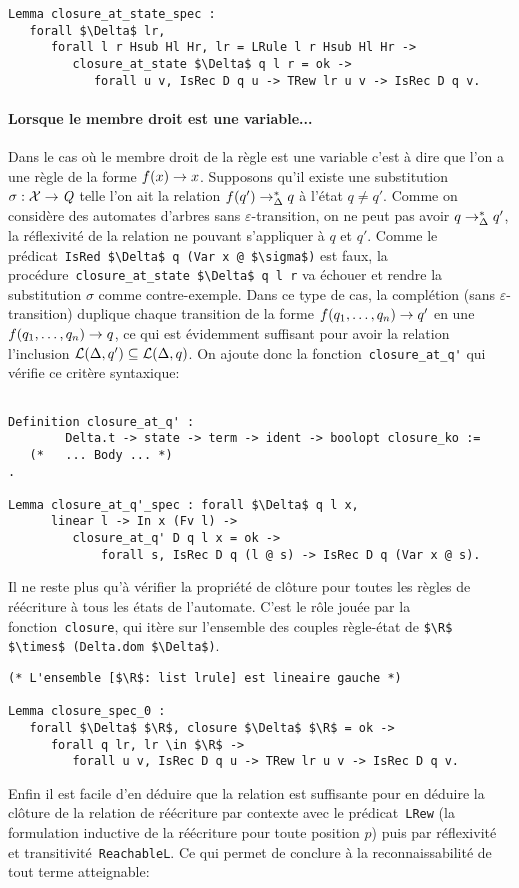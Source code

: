 \begin{lstlisting}
Lemma closure_at_state_spec : 
   forall $\Delta$ lr, 
      forall l r Hsub Hl Hr, lr = LRule l r Hsub Hl Hr ->
         closure_at_state $\Delta$ q l r = ok ->
            forall u v, IsRec D q u -> TRew lr u v -> IsRec D q v.
\end{lstlisting}


\paragraph{Lorsque le membre droit est une variable...}
\label{par:si-le-membre}
Dans le cas où le membre droit de la règle est une variable c'est à dire que l'on a une règle de la forme 
$f(x) \rightarrow x$. Supposons qu'il existe une substitution $\sigma : \mathcal X \rightarrow \mathit Q$ telle l'on ait la relation 
$f(q') \rightarrow_\Delta^* q$ à l'état $q \not= q'$. Comme on considère des automates d'arbres sans $\varepsilon$-transition,
on ne peut pas avoir $q \rightarrow^*_\Delta q'$, la réflexivité de la relation ne pouvant s'appliquer à $q$ et $q'$.
Comme le prédicat~\lstinline!IsRed $\Delta$ q (Var x @ $\sigma$)! est faux, la procédure~\lstinline!closure_at_state $\Delta$ q l r!
va échouer et rendre la substitution $\sigma$ comme contre-exemple. 
Dans ce type de cas, la complétion (sans $\varepsilon$-transition) duplique chaque transition de la forme $f(q_1,\dots,q_n) \rightarrow q'$ en une $f(q_1,\dots,q_n) \rightarrow q$,
ce qui est évidemment suffisant pour avoir la relation l'inclusion $\mathcal{L}(\Delta, q') \subseteq \mathcal{L}(\Delta, q)$.
On ajoute donc la fonction~\lstinline!closure_at_q'! qui vérifie ce critère syntaxique:

\begin{lstlisting}

Definition closure_at_q' :
        Delta.t -> state -> term -> ident -> boolopt closure_ko :=
   (*   ... Body ... *)
.

Lemma closure_at_q'_spec : forall $\Delta$ q l x,
      linear l -> In x (Fv l) ->
         closure_at_q' D q l x = ok ->
             forall s, IsRec D q (l @ s) -> IsRec D q (Var x @ s).
\end{lstlisting}


Il ne reste plus qu'à vérifier la propriété de clôture pour toutes les règles de réécriture 
à tous les états de l'automate. C'est le rôle jouée par la fonction~\lstinline!closure!,
qui itère sur l'ensemble des couples règle-état de \lstinline!$\R$ $\times$ (Delta.dom $\Delta$)!.

\begin{lstlisting}
(* L'ensemble [$\R$: list lrule] est lineaire gauche *)

Lemma closure_spec_0 : 
   forall $\Delta$ $\R$, closure $\Delta$ $\R$ = ok ->
      forall q lr, lr \in $\R$ ->
         forall u v, IsRec D q u -> TRew lr u v -> IsRec D q v.
\end{lstlisting}
Enfin il est facile d'en déduire que la relation est suffisante 
pour en déduire la clôture de la relation de réécriture
par contexte avec le prédicat~\lstinline!LRew! (la formulation inductive de la réécriture pour toute position $p$)
puis par réflexivité et transitivité~\lstinline!ReachableL!. Ce qui permet de conclure
à la reconnaissabilité de tout terme atteignable: 

